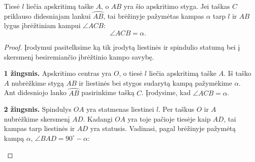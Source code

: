 \documentclass[11pt,a4paper]{scrartcl}
\begin{document}
\begin{proposition}
Tiesė $l$ liečia apskritimą taške $A$, o $AB$ yra šio apskritimo styga. Jei taškas $C$ priklauso didesniajam lankui $\wideparen{AB}$, tai brėžinyje pažymėtas kampas $\alpha$ tarp $l$ ir $AB$ lygus įbrėžtiniam kampui $\angle ACB$:
\[
\angle ACB = \alpha.
\]
\end{proposition}

\begin{proof}
Įrodymui pasitelksime ką tik įrodytą liestinės ir spindulio statumą bei į skersmenį besiremiančio įbrėžtinio kampo savybę.

\textbf{1 žingsnis.} Apskritimo centras yra \(O\), o tiesė \(l\) liečia apskritimą taške \(A\). Iš taško $A$ nubrėžkime stygą $AB$ ir liestinės bei stygos sudarytą kampą pažymėkime $\alpha$. Ant didesniojo lanko $\wideparen{AB}$ pasirinkime tašką $C$. Įrodysime, kad $\angle ACB=\alpha$.
\begin{center}
\end{center}

\textbf{2 žingsnis.} Spindulys $OA$ yra statmenas liestinei $l$. Per taškus $O$ ir $A$ nubrėžkime skersmenį $AD$. Kadangi $OA$ yra toje pačioje tiesėje kaip $AD$, tai kampas tarp liestinės ir $AD$ yra statusis. Vadinasi, pagal brėžinyje pažymėtą kampą $\alpha$, $\angle BAD=90^\circ-\alpha$:
\begin{center}
\end{center}
\end{proof}
\end{document}
